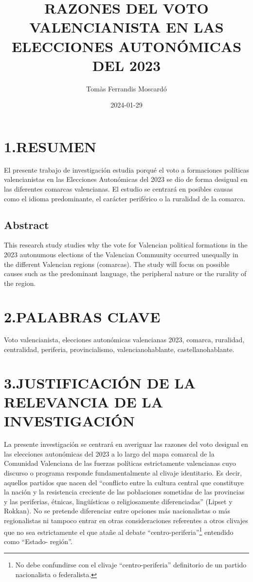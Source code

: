 \documentclass[
]{article}
\title{RAZONES DEL VOTO VALENCIANISTA EN LAS ELECCIONES AUTONÓMICAS DEL
2023}
\author{Tomàs Ferrandis Moscardó}
\date{2024-01-29}
\begin{document}
\maketitle

{
\setcounter{tocdepth}{2}
\tableofcontents
}
\hypertarget{resumen}{%
\section{1.RESUMEN}\label{resumen}}

El presente trabajo de investigación estudia porqué el voto a
formaciones políticas valencianistas en las Elecciones Autonómicas del
2023 se dio de forma desigual en las diferentes comarcas valencianas. El
estudio se centrará en posibles causas como el idioma predominante, el
carácter periférico o la ruralidad de la comarca.

\hypertarget{abstract}{%
\subsection{Abstract}\label{abstract}}

This research study studies why the vote for Valencian political
formations in the 2023 autonumous elections of the Valencian Community
occurred unequally in the different Valencian regions (comarcas). The
study will focus on possible causes such as the predominant language,
the peripheral nature or the rurality of the region.

\hypertarget{palabras-clave}{%
\section{2.PALABRAS CLAVE}\label{palabras-clave}}

Voto valencianista, elecciones autonómicas valencianas 2023, comarca,
ruralidad, centralidad, periferia, provincialismo, valencianohablante,
castellanohablante.

\hypertarget{justificaciuxf3n-de-la-relevancia-de-la-investigaciuxf3n}{%
\section{3.JUSTIFICACIÓN DE LA RELEVANCIA DE LA
INVESTIGACIÓN}\label{justificaciuxf3n-de-la-relevancia-de-la-investigaciuxf3n}}

La presente investigación se centrará en averiguar las razones del voto
desigual en las elecciones autonómicas del 2023 a lo largo del mapa
comarcal de la Comunidad Valenciana de las fuerzas políticas
estrictamente valencianas cuyo discurso o programa responde
fundamentalmente al clivaje identitario. Es decir, aquellos partidos que
nacen del ``conflicto entre la cultura central que constituye la nación
y la resistencia creciente de las poblaciones sometidas de las
provincias y las periferias, étnicas, lingüísticas o religiosamente
diferenciadas'' (Lipset y Rokkan). No se pretende diferenciar entre
opciones más nacionalistas o más regionalistas ni tampoco entrar en
otras consideraciones referentes a otros clivajes que no sea
estrictamente el que atañe al debate ``centro-periferia''\footnote{No
  debe confundirse con el clivaje ``centro-periferia'' definitorio de un
  partido nacionalista o federalista.} entendido como ``Estado-
región''.
\end{document}
